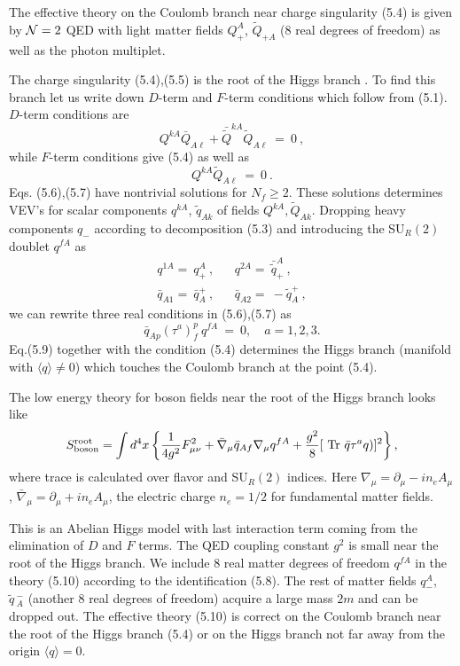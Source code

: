 \documentclass[a4paper,12pt]{article}
\begin{document}
The effective theory on the Coulomb branch near charge
singularity (5.4) is given by ${\cal N}=2$ QED with light matter fields
$Q^A_+$, $\widetilde Q_{+A}$ (8 real degrees of freedom) as well as the
photon multiplet.

The charge singularity (5.4),(5.5) is the root of the Higgs
branch \cite{SW2}. To find this branch let us write down $D$-term
and $F$-term conditions which follow from (5.1). $D$-term
conditions are
\begin{equation}
Q^{kA}\bar Q_{A\ell}+\bar{\widetilde Q}^{kA}\widetilde Q_{A\ell}\ =\ 0\ ,
\end{equation}
while $F$-term conditions give (5.4) as well as
\begin{equation}
Q^{kA}\widetilde Q_{A\ell}\ =\ 0\ .
\end{equation}
Eqs. (5.6),(5.7) have nontrivial solutions for $N_f\ge2$. These
solutions determines VEV's for scalar components  $q^{kA}$, $\widetilde
q_{Ak}$ of fields $Q^{kA}, \widetilde Q_{Ak}$. Dropping heavy
components $q_-$ according to decomposition (5.3) and
introducing the SU$_R(2)$ doublet $q^{fA}$ as
\begin{eqnarray}
q^{1A}=\ q^A_+\ , && q^{2A}=\ \bar{\widetilde q}^A_+\ , \nonumber\\
\bar q_{A1}=\ \bar q^+_A\ , && \bar q_{A2}=\ -\widetilde q^+_A\ ,
\end{eqnarray}
we can rewrite three real conditions in (5.6),(5.7) as
\begin{equation}
\bar q_{Ap}(\tau^a)^p_f\ q^{fA}\ =\ 0, \quad a=1,2,3.
\end{equation}
Eq.(5.9) together with the condition (5.4) determines the Higgs
branch (manifold with $\langle q\rangle\neq0$) which touches the
Coulomb branch at the point (5.4).

The low energy theory for boson fields near the root of the Higgs
branch looks like
\begin{equation}
S^{\rm root}_{\rm boson}=\int d^4x\left\{\frac1{4g^2}
F^2_{\mu\nu}+\bar\nabla_\mu\bar q_{Af}\nabla_\mu q^{fA}+
\frac{g^2}8[\mbox{ Tr }\bar q\tau^aq)]^2\right\},
\end{equation}
where trace is calculated over flavor and SU$_R(2)$ indices.
Here $\nabla_\mu=\partial_\mu-in_eA_\mu$, $\bar\nabla_\mu=
\partial_\mu+in_eA_\mu$, the electric charge $n_e=1/2$ for
fundamental matter fields.

This is an Abelian Higgs model with last interaction term coming
from the elimination of $D$ and $F$ terms. The QED coupling
constant $g^2$ is small near the root of the Higgs branch.
 We include 8 real matter degrees of
freedom $q^{fA}$ in the theory (5.10) according to the
identification (5.8). The rest of matter fields $q^A_-$, $\widetilde
q\,^-_A$ (another 8 real degrees of freedom) acquire a large mass
$2m$ and can be dropped out. The effective theory (5.10) is
correct on the Coulomb branch near the root of the Higgs branch
(5.4) or on the Higgs branch not far away from the origin
$\langle q\rangle=0$.
\end{document}
